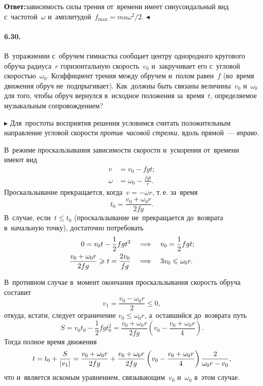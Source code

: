 \documentclass{weekly}
\begin{document}
\textbf{Ответ:}\quad зависимость силы трения от~времени
имеет синусоидальный вид с~частотой~$\omega$
и~амплитудой~$f_{\max} = ma\omega^2/2$.
\hfill $\blacktriangleleft$


\paragraph{6.30.} В~упражнении с~обручем гимнастка сообщает центру
однородного кругового обруча радиуса~$r$ горизонтальную скорость~$v_0$
и~закручивает его с~угловой скоростью~$\omega_0$.
Коэффициент трения между обручем и~полом равен~$f$
(во~время движения обруч не~подпрыгивает).
Как~должны быть связаны величины~$v_0$ и~$\omega_0$ для того,
чтобы обруч вернулся в~исходное положения за~время~$t$,
определяемое музыкальным сопровождением?

$\blacktriangleright$ Для~простоты восприятия решения
условимся считать положительным направление угловой скорости
\emph{против~часовой стрелки,} вдоль прямой~--- \emph{вправо.}

В~режиме проскальзывания зависимости скорости и~ускорения от~времени
имеют вид
\begin{align}
    v &= v_0 - fgt; \\
    \omega &= \omega_0 - \frac{fgt}{r}.
\end{align}
Проскальзывание прекращается, когда~$v = -\omega r$,
т.\,е. за~время
\begin{equation}
    t_0 = \frac{v_0 + \omega_0 r}{2fg}.
\end{equation}
В~случае, если~$t \leqslant t_0$ (проскальзывание не~прекращается
до~возврата в~начальную точку), достаточно потребовать
\begin{align}
    0 = v_0 t - \frac12 fgt^2
&\quad \Longrightarrow \quad
    v_0 = \frac12 fgt;
\\
    \frac{v_0 + \omega_0 r}{2fg} \geqslant t
            = \frac{2v_0}{fg}
&\quad \Longrightarrow \quad
    3v_0 \leqslant \omega_0 r.
\end{align}

В~противном случае в~момент окончания проскальзывания скорость
обруча составит
\begin{equation}
    v_1 = \frac{v_0 - \omega_0 r}{2} \leqslant 0,
\end{equation}
откуда, кстати, следует ограничение $v_0 \leqslant \omega_0 r$,
а~оставшийся до~возврата путь
\begin{equation}
    S = v_0 t_0 - \frac12 fg t_0^2
        = \frac{v_0 + \omega_0 r}{2fg} 
            \left(v_0 - \frac{v_0 + \omega_0 r}{4}\right).
\end{equation}
Тогда полное время движения
\begin{gather}
    t = t_0 + \frac{S}{\left| v_1 \right|}
        = \frac{v_0 + \omega_0 r}{2fg} +
            \frac{v_0 + \omega_0 r}{2fg}
            \left(v_0 - \frac{v_0 + \omega_0 r}{4}\right)
            \frac{2}{\omega_0 r - v_0},
    \label{6.30:gibberish}
\end{gather}
что и~является искомым уравнением, связывающим~$v_0$
и~$\omega_0$ в~этом случае.
\end{document}
